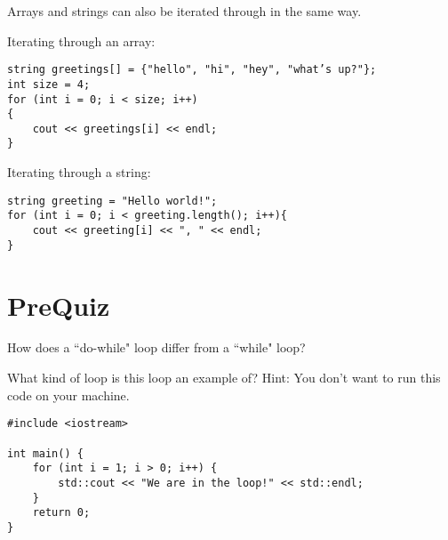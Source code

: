 Arrays and strings can also be iterated through in the same way.

\begin{example}
    Iterating through an array:
    \begin{verbatim}
string greetings[] = {"hello", "hi", "hey", "what’s up?"};
int size = 4;
for (int i = 0; i < size; i++)
{
    cout << greetings[i] << endl;
}
    \end{verbatim}

    Iterating through a string:
    \begin{verbatim}
string greeting = "Hello world!";
for (int i = 0; i < greeting.length(); i++){
    cout << greeting[i] << ", " << endl;
}
    \end{verbatim}
\end{example}

\section{PreQuiz}

\begin{problem}
    How does a ``do-while" loop differ from a ``while" loop?
\end{problem}

\begin{problem}
What kind of loop is this loop an example of? Hint: You don't want to run this code on your machine.
\begin{verbatim}
#include <iostream>

int main() {
    for (int i = 1; i > 0; i++) {
        std::cout << "We are in the loop!" << std::endl;
    }
    return 0;
}
\end{verbatim}
\end{problem}


